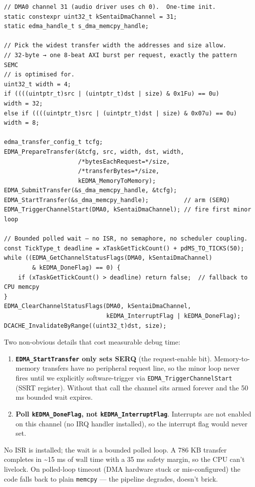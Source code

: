 \begin{verbatim}
// DMA0 channel 31 (audio driver uses ch 0).  One-time init.
static constexpr uint32_t kSentaiDmaChannel = 31;
static edma_handle_t s_dma_memcpy_handle;

// Pick the widest transfer width the addresses and size allow.
// 32-byte → one 8-beat AXI burst per request, exactly the pattern SEMC
// is optimised for.
uint32_t width = 4;
if ((((uintptr_t)src | (uintptr_t)dst | size) & 0x1Fu) == 0u)      width = 32;
else if ((((uintptr_t)src | (uintptr_t)dst | size) & 0x07u) == 0u) width = 8;

edma_transfer_config_t tcfg;
EDMA_PrepareTransfer(&tcfg, src, width, dst, width,
                     /*bytesEachRequest=*/size,
                     /*transferBytes=*/size,
                     kEDMA_MemoryToMemory);
EDMA_SubmitTransfer(&s_dma_memcpy_handle, &tcfg);
EDMA_StartTransfer(&s_dma_memcpy_handle);          // arm (SERQ)
EDMA_TriggerChannelStart(DMA0, kSentaiDmaChannel); // fire first minor loop

// Bounded polled wait — no ISR, no semaphore, no scheduler coupling.
const TickType_t deadline = xTaskGetTickCount() + pdMS_TO_TICKS(50);
while ((EDMA_GetChannelStatusFlags(DMA0, kSentaiDmaChannel)
        & kEDMA_DoneFlag) == 0) {
    if (xTaskGetTickCount() > deadline) return false;  // fallback to CPU memcpy
}
EDMA_ClearChannelStatusFlags(DMA0, kSentaiDmaChannel,
                             kEDMA_InterruptFlag | kEDMA_DoneFlag);
DCACHE_InvalidateByRange((uint32_t)dst, size);
\end{verbatim}

Two non-obvious details that cost measurable debug time:

\begin{enumerate}
\def\labelenumi{\arabic{enumi}.}
\tightlist
\item
  \textbf{\texttt{EDMA\_StartTransfer} only sets SERQ} (the
  request-enable bit). Memory-to-memory transfers have no peripheral
  request line, so the minor loop never fires until we explicitly
  software-trigger via \texttt{EDMA\_TriggerChannelStart} (SSRT
  register). Without that call the channel sits armed forever and the 50
  ms bounded wait expires.
\item
  \textbf{Poll \texttt{kEDMA\_DoneFlag}, not
  \texttt{kEDMA\_InterruptFlag}}. Interrupts are not enabled on this
  channel (no IRQ handler installed), so the interrupt flag would never
  set.
\end{enumerate}

No ISR is installed; the wait is a bounded polled loop. A 786 KB
transfer completes in \textasciitilde15 ms of wall time with a 35 ms
safety margin, so the CPU can't livelock. On polled-loop timeout (DMA
hardware stuck or mis-configured) the code falls back to plain
\texttt{memcpy} --- the pipeline degrades, doesn't brick.

